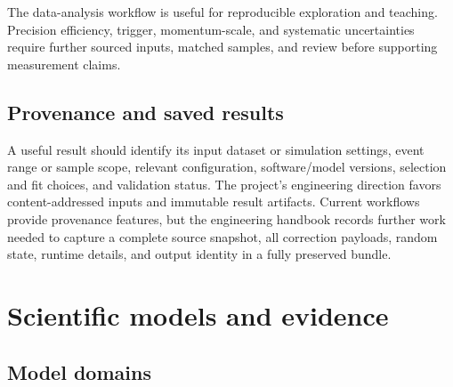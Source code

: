 \documentclass[11pt,a4paper]{article}
\begin{document}
The data-analysis workflow is useful for reproducible exploration and
teaching. Precision efficiency, trigger, momentum-scale, and systematic
uncertainties require further sourced inputs, matched samples, and review
before supporting measurement claims.

\subsection{Provenance and saved results}

A useful result should identify its input dataset or simulation settings, event
range or sample scope, relevant configuration, software/model versions,
selection and fit choices, and validation status. The project's engineering
direction favors content-addressed inputs and immutable result artifacts.
Current workflows provide provenance features, but the engineering handbook
records further work needed to capture a complete source snapshot, all
correction payloads, random state, runtime details, and output identity in a
fully preserved bundle.

\section{Scientific models and evidence}

\subsection{Model domains}
\end{document}
